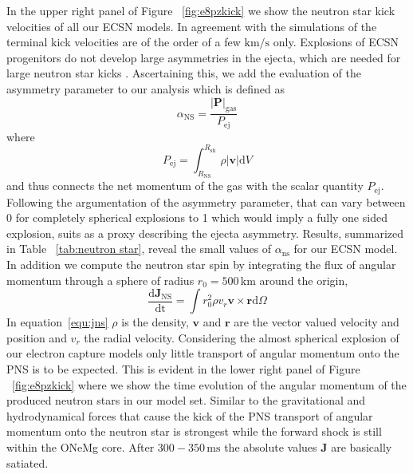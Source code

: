 \documentclass[fleqn,usenatbib]{mnras}
\newcommand{\ud}{\ensuremath{\mathrm{d}}}
\begin{document}
In the upper right panel of Figure ~\ref{fig:e8pzkick} we show the neutron star kick velocities of all our ECSN models. In agreement with the simulations of \citet{Gessner2018} the terminal kick velocities are of the order of a few $\mathrm{km/s}$ only. Explosions of ECSN progenitors do not develop large asymmetries in the ejecta, which are needed for large neutron star kicks \cite{Scheck2006,Janka2017}. Ascertaining this, we add the evaluation of the asymmetry parameter to our analysis which is defined as 
\begin{equation}
    \alpha_{\mathrm{NS}} = \frac{|\mathbf{P}|_{\mathrm{gas}}}{P_{\mathrm{ej}}}
\end{equation}
where 
\begin{equation}
P_{\mathrm{ej}}=\int_{R_{\mathrm{NS}}}^{R_{\mathrm{sh}}}\rho |\mathbf{v}| \ud V
\end{equation}
and thus connects the net momentum of the gas with the scalar quantity $P_{\mathrm{ej}}$. Following the argumentation of \cite{Gessner2018} the asymmetry parameter, that can vary between 0 for completely spherical explosions to 1 which would imply a fully one sided explosion, suits as a proxy describing the ejecta asymmetry. Results, summarized in Table ~\ref{tab:neutron star}, reveal the small values of $\alpha_{\mathrm{ns}}$ for our ECSN model.
In addition we compute the neutron star spin by integrating the flux of angular momentum through a sphere of radius $r_{0}=500\,\mathrm{km}$ around the origin,
\begin{equation}
\label{equ:jns}
\frac{\mathrm{d}\mathbf{J}_{\mathrm{NS}}}{\mathrm{dt}} = \int r_0^2 \rho v_r \mathbf{v}\times \mathbf{r} \mathrm{d}\Omega
\end{equation}
In equation~\ref{equ:jns} $\rho$ is the density, $\mathbf{v}$ and $\mathbf{r}$ are the vector valued velocity and position and $v_r$ the radial velocity. Considering the almost spherical explosion of our electron capture models only little transport of angular momentum onto the PNS is to be expected. This is evident in the lower right panel of Figure ~\ref{fig:e8pzkick} where we show the time evolution of the angular momentum of the produced neutron stars in our model set. Similar to the gravitational and hydrodynamical forces that cause the kick of the PNS transport of angular momentum onto the neutron star is strongest while the forward shock is still within the ONeMg core. After $300-350\,\text{ms}$ the absolute values $\mathbf{J}$ are basically satiated.
\end{document}
